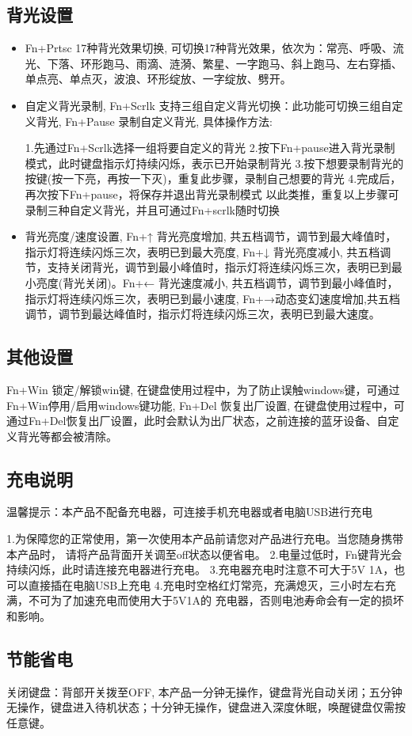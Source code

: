 \subsection{背光设置}
\begin{itemize}
\item Fn+Prtsc 17种背光效果切换, 可切换17种背光效果，依次为：常亮、呼吸、流光、下落、环形跑马、雨滴、涟漪、繁星、一字跑马、斜上跑马、左右穿插、单点亮、单点灭，波浪、环形绽放、一字绽放、劈开。
\item 自定义背光录制, Fn+Scrlk 支持三组自定义背光切换：此功能可切换三组自定义背光, Fn+Pause 录制自定义背光, 具体操作方法:
\begin{messagebox}
1.先通过Fn+Scrlk选择一组将要自定义的背光
2.按下Fn+pause进入背光录制模式，此时键盘指示灯持续闪烁，表示已开始录制背光
3.按下想要录制背光的按键(按一下亮，再按一下灭)，重复此步骤，录制自己想要的背光
4.完成后，再次按下Fn+pause，将保存并退出背光录制模式
以此类推，重复以上步骤可录制三种自定义背光，并且可通过Fn+scrlk随时切换
\end{messagebox}

\item 背光亮度/速度设置, Fn+↑ 背光亮度增加, 共五档调节，调节到最大峰值时，指示灯将连续闪烁三次，表明已到最大亮度, Fn+↓ 背光亮度减小, 共五档调节，支持关闭背光，调节到最小峰值时，指示灯将连续闪烁三次，表明已到最小亮度(背光关闭)。Fn+← 背光速度减小, 共五档调节，调节到最小峰值时，指示灯将连续闪烁三次，表明已到最小速度, Fn+→动态变幻速度增加,共五档调节，调节到最达峰值时，指示灯将连续闪烁三次，表明已到最大速度。
\end{itemize}

\subsection{其他设置}
Fn+Win 锁定/解锁win键, 在键盘使用过程中，为了防止误触windows键，可通过Fn+Win停用/启用windows键功能, Fn+Del 恢复出厂设置, 在键盘使用过程中，可通过Fn+Del恢复出厂设置，此时会默认为出厂状态，之前连接的蓝牙设备、自定义背光等都会被清除。


\subsection{充电说明}
温馨提示：本产品不配备充电器，可连接手机充电器或者电脑USB进行充电
\begin{messagebox}
1.为保障您的正常使用，第一次使用本产品前请您对产品进行充电。当您随身携带本产品时，
请将产品背面开关调至off状态以便省电。
2.电量过低时，Fn键背光会持续闪烁，此时请连接充电器进行充电。
3.充电器充电时注意不可大于5V 1A，也可以直接插在电脑USB上充电
4.充电时空格红灯常亮，充满熄灭，三小时左右充满，不可为了加速充电而使用大于5V1A的
充电器，否则电池寿命会有一定的损坏和影响。
\end{messagebox}

\subsection{节能省电}
关闭键盘：背部开关拨至OFF, 本产品一分钟无操作，键盘背光自动关闭；五分钟无操作，键盘进入待机状态；十分钟无操作，键盘进入深度休眠，唤醒键盘仅需按任意键。
